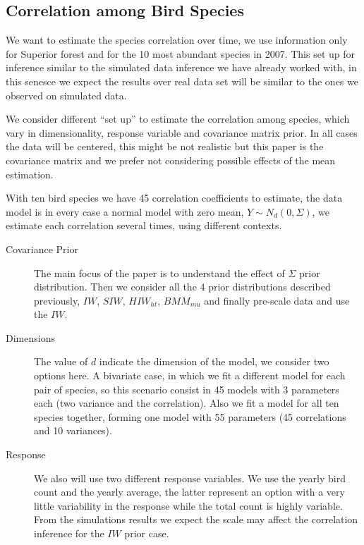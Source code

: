 \documentclass[a4paper]{article}
\begin{document}
\subsection{ Correlation among Bird Species}

We want to estimate the species correlation over time, we use information only for Superior forest and for the 10 most abundant species in 2007. This set up for inference similar to the simulated data inference we have already worked with, in this senesce we expect the results over real data set will be similar to the ones we observed on simulated data. 

We consider different ``set up'' to estimate the correlation among species, which vary in dimensionality, response variable and covariance matrix prior. In all cases the data will be centered, this might be not realistic but this paper is the covariance matrix and we prefer not considering possible effects of the mean estimation.  

With ten bird species we have 45 correlation coefficients to estimate, the data model is in every case a normal model with zero mean, $Y \sim N_d(0, \Sigma)$, we estimate each correlation several times, using different contexts. 

\begin{description}
\item[Covariance Prior] The main focus of the paper is to understand the effect of  $\Sigma$ prior distribution. Then we consider all the 4 prior distributions described previously, $IW$, $SIW$, $HIW_{ht}$, $BMM_{mu}$ and finally pre-scale data and use the $IW$. 

\item[ Dimensions] The value of $d$ indicate the dimension of the model, we consider two options here. A bivariate case, in which we fit a different model for each pair of species, so this scenario consist in 45 models with 3 parameters each (two variance and the correlation). Also we fit a model for all ten species together, forming one model with 55 parameters (45 correlations and 10 variances). 

\item[Response] We also will use two different response variables. We use the yearly bird count and the yearly average, the latter represent an option with a very little variability in the response while the total count is highly variable. From the simulations results we expect the scale may affect the correlation inference for the $IW$ prior case. 
\end{description}
\end{document}

